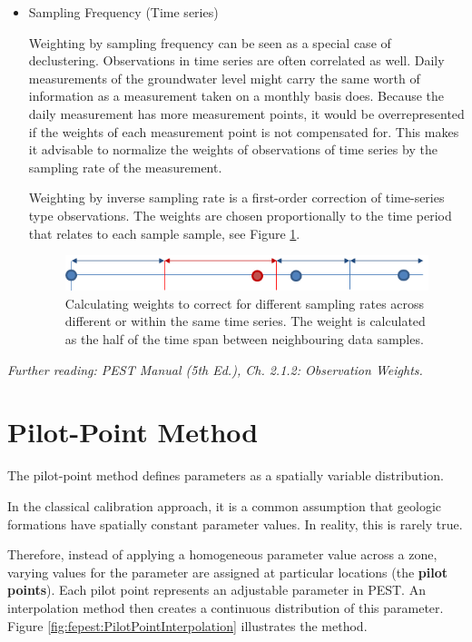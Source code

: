 \begin{itemize}
\item Sampling Frequency (Time series)

Weighting by sampling frequency can be seen as a special case of declustering. Observations in time series are often correlated as well. Daily measurements of the groundwater level might carry the same worth of information as a measurement taken on a monthly basis does. Because the daily measurement has more measurement points, it would be overrepresented if the weights of each measurement point is not compensated for. This makes it advisable to normalize the weights of observations of time series by the sampling rate of the measurement.

Weighting by inverse sampling rate is a first-order correction of time-series type observations. The weights are chosen proportionally to the time period that relates to each sample sample, see Figure \ref{fig:fepest:TSweighting}.

\begin{figure}
	\center
	\includegraphics[width=\columnwidth]{figures/TSweighting.png}
\caption{Calculating weights to correct for different sampling rates across different or within the same time series. The weight is calculated as the half of the time span between neighbouring data samples.}
\label{fig:fepest:TSweighting}
\end{figure}

\end{itemize}

\textit{Further reading: PEST Manual (5th Ed.), Ch. 2.1.2: Observation Weights.}

\section{Pilot-Point Method}

The pilot-point method defines parameters as a spatially variable distribution.

In the classical calibration approach, it is a common assumption that geologic formations have spatially constant parameter values. In reality, this is rarely true.

Therefore, instead of applying a homogeneous parameter value across a zone, varying values for the parameter are assigned at particular locations (the \textbf{pilot points}). Each pilot point represents an adjustable parameter in PEST. An interpolation method then creates a continuous distribution of this parameter. Figure \ref{fig:fepest:PilotPointInterpolation} illustrates the method.

